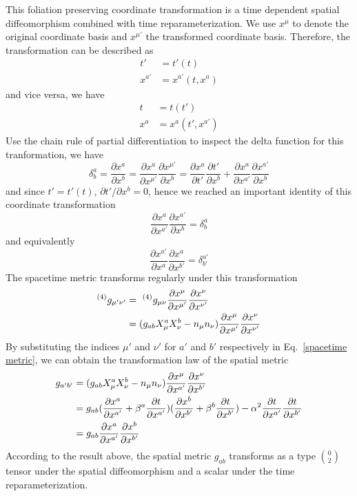 \documentclass[letterpaper,nofootinbib,prd,amsmath,onecolumn]{revtex4-1}
\begin{document}
This foliation preserving coordinate transformation is a time dependent spatial diffeomorphism combined with time reparameterization. We use $x^{\mu}$ to denote the original coordinate basis and $x^{\mu'}$ the transformed coordinate basis. Therefore, the transformation can be described as
\begin{align*}
t' & = t'(t)\\
x^{a'} & = x^{a'}(t,x^{a})
\end{align*}
and vice versa, we have
\begin{align*}
t & = t(t')\\
x^{a} & = x^{a}(t',x^{a'})
\end{align*}
Use the chain rule of partial differentiation to inspect the delta function for this tranformation, we have
\[
\delta^{a}_{b} = \frac{\partial x^{a}}{\partial x^{b}} = \frac{\partial x^{a}}{\partial x^{\mu'}}\frac{\partial x^{\mu'}}{\partial x^{b}} = \frac{\partial x^{a}}{\partial t'}\frac{\partial t'}{\partial x^{b}} + \frac{\partial x^{a}}{\partial x^{a'}}\frac{\partial x^{a'}}{\partial x^{b}}
\]
and since $t' = t'(t)$, $\partial t'/\partial x^{b} = 0$, hence we reached an important identity of this coordinate transformation
\begin{equation}
\frac{\partial x^{a}}{\partial x^{a'}}\frac{\partial x^{a'}}{\partial x^{b}} = \delta^{a}_{b}
\end{equation}
and equivalently
\begin{equation}
\frac{\partial x^{a'}}{\partial x^{a}}\frac{\partial x^{a}}{\partial x^{b'}} = \delta^{a'}_{b'}
\end{equation}
The spacetime metric transforms regularly under this transformation
\begin{align}\label{spacetime metric}
^{(4)}g_{\mu'\nu'} &=~^{(4)}g_{\mu\nu}\frac{\partial x^{\mu}}{\partial x^{\mu'}}\frac{\partial x^{\nu}}{\partial x^{\nu'}}\notag\\
& = (g_{ab}X^{a}_{\mu}X^{b}_{\nu} - n_{\mu}n_{\nu})\frac{\partial x^{\mu}}{\partial x^{\mu'}}\frac{\partial x^{\nu}}{\partial x^{\nu'}}
\end{align}
By substituting the indices $\mu'$ and $\nu'$ for $a'$ and $b'$ respectively in Eq.~\ref{spacetime metric}, we can obtain the transformation law of the spatial metric
\begin{align}
g_{a'b'} & = (g_{ab}X^{a}_{\mu}X^{b}_{\nu} - n_{\mu}n_{\nu})\frac{\partial x^{\mu}}{\partial x^{a'}}\frac{\partial x^{\nu}}{\partial x^{b'}}\notag\\
&= g_{ab}(\frac{\partial x^{a}}{\partial x^{a'}} + \beta^{a}\frac{\partial t}{\partial x^{a'}})(\frac{\partial x^{b}}{\partial x^{b'}} + \beta^{b}\frac{\partial t}{\partial x^{b'}}) - \alpha^2\frac{\partial t}{\partial x^{a'}}\frac{\partial t}{\partial x^{b'}}\notag\\
& = g_{ab}\frac{\partial x^{a}}{\partial x^{a'}}\frac{\partial x^{b}}{\partial x^{b'}}
\end{align}
According to the result above, the spatial metric $g_{ab}$ transforms as a type $0 \choose 2$ tensor under the spatial diffeomorphism and a scalar under the time reparameterization.
\end{document}
